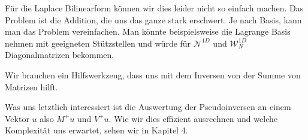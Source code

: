 Für die Laplace Bilinearform können wir dies leider nicht so einfach machen. Das Problem ist die Addition, die uns das ganze stark erschwert. Je nach Basis, kann man das Problem vereinfachen. Man könnte beispielsweise die Lagrange Basis nehmen mit geeigneten Stützstellen und würde für $\mathcal{N}^{1D}$ und $\mathcal{W}_N^{1D}$ Diagonalmatrizen bekommen.

Wir brauchen ein Hilfswerkzeug, dass uns mit dem Inversen von der Summe von Matrizen hilft. 

Was uns letztlich interessiert ist die Auswertung der Pseudoinversen an einem Vektor $u$ also $M^+ u$ und $V^+ u$. Wie wir dies effizient ausrechnen und welche Komplexität uns erwartet, sehen wir in Kapitel 4.

